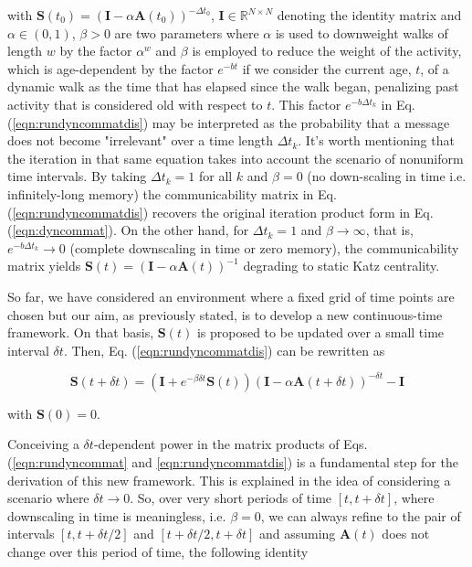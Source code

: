  with $\mathbf{S}(t_0) = (\mathbf{I} - \alpha \mathbf{A}(t_0))^{-\Delta t_0}$, $\mathbf{I}\in \mathbb{R}^{N\times N}$ denoting the identity matrix and $\alpha \in (0,1)$, $\beta > 0$ are two parameters where $\alpha$ is used to downweight walks of length $w$ by the factor $\alpha^w$ and $\beta$ is employed to reduce the weight of the activity, which is age-dependent by the factor $e^{-bt}$ if we consider the current age, $t$, of a dynamic walk as the time that has elapsed since the walk began, penalizing past activity that is considered old with respect to $t$. This factor $e^{-b\Delta t_k}$ in Eq. (\ref{eqn:rundyncommatdis}) may be interpreted as the probability that a message does not become "irrelevant" over a time length $\Delta t_k$. It's worth mentioning that the iteration in that same equation takes into account the scenario of nonuniform time intervals. By taking $\Delta t_k = 1$ for all $k$ and $\beta = 0$ (no down-scaling in time i.e. infinitely-long memory) the communicability matrix in Eq. (\ref{eqn:rundyncommatdis}) recovers the original iteration product form in Eq. (\ref{eqn:dyncommat}). On the other hand, for $\Delta t_k = 1$ and $\beta \to \infty$, that is, $e^{-b\Delta t_k}\to 0$ (complete downscaling in time or zero memory), the communicability matrix yields $\mathbf{S}(t)=(\mathbf{I} - \alpha \mathbf{A}(t))^{-1}$ degrading to static Katz centrality.

 So far, we have considered an environment where a fixed grid of time points are chosen but our aim, as previously stated, is to develop a new continuous-time framework. On that basis, $\mathbf{S}(t)$ is proposed to be updated over a small time interval $\delta t$. Then, Eq. (\ref{eqn:rundyncommatdis}) can be rewritten as
 
 \begin{equation}
\label{eqn:rundyncommat}
    \mathbf{S}(t + \delta t) = (\mathbf{I} + e^{-\beta\delta t}\mathbf{S}(t)) (\mathbf{I} - \alpha\mathbf{A}(t+\delta t))^{-\delta t} - \mathbf{I}
\end{equation} 

with $\mathbf{S}(0)=0$.

Conceiving a $\delta t$-dependent power in the matrix products of Eqs. (\ref{eqn:rundyncommat} and \ref{eqn:rundyncommatdis}) is a fundamental step for the derivation of this new framework. This is explained in the idea of considering a scenario where $\delta t \to 0$. So, over very short periods of time $[t,t+\delta t]$, where downscaling in time is meaningless, i.e. $\beta = 0$, we can always refine to the pair of intervals $[t, t + \delta t/2]$ and $[t + \delta t/2, t + \delta t]$ and assuming $\mathbf{A}(t)$ does not change over this period of time, the following identity 

